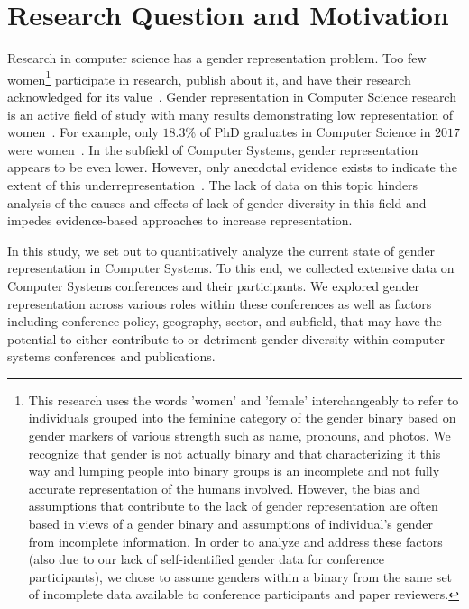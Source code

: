 \documentclass{sig-alternate-05-2015}
\begin{document}
\section{Research Question and Motivation}
Research in computer science has a gender representation problem. Too few women\footnote{This research uses the words 'women' and 'female' interchangeably to refer to individuals grouped into the feminine category of the gender binary based on gender markers of various strength such as name, pronouns, and photos. We recognize that gender is not actually binary and that characterizing it this way and lumping people into binary groups is an incomplete and not fully accurate representation of the humans involved. However, the bias and assumptions that contribute to the lack of gender representation are often based in views of a gender binary and assumptions of individual’s gender from incomplete information. In order to analyze and address these factors (also due to our lack of self-identified gender data for conference participants), we chose to assume genders within a binary from the same set of incomplete data available to conference participants and paper reviewers.} participate in research, publish about it, and have their research acknowledged for its value~\cite{too:few}. Gender representation in Computer Science research is an active field of study with many results demonstrating low representation of women~\cite{tobin:equality}. For example, only $18.3$\% of PhD graduates in Computer Science in $2017$ were women~\cite{zweben18:taulbee}. In the subfield of Computer Systems, gender representation appears to be even lower. However, only anecdotal evidence exists to indicate the extent of this underrepresentation~\cite{anitab:anecdote}. The lack of data on this topic hinders analysis of the causes and effects of lack of gender diversity in this field and impedes evidence-based approaches to increase representation.

 In this study, we set out to quantitatively analyze the current state of gender representation in Computer Systems. To this end, we collected extensive data on Computer Systems conferences and their participants. We explored gender representation across various roles within these conferences as well as factors including conference policy, geography, sector, and subfield, that may have the potential to either contribute to or detriment gender diversity within computer systems conferences and publications. 
 
\end{document}
